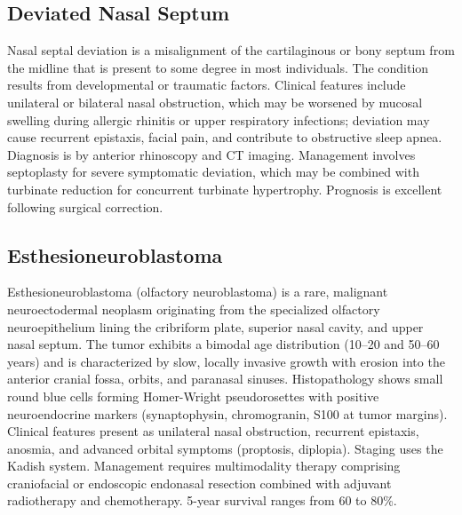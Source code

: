 \subsection{Deviated Nasal Septum}
\label{sec:Deviated Nasal Septum}
Nasal septal deviation is a misalignment of the cartilaginous or bony septum from the midline that is present to some degree in most individuals. The condition results from developmental or traumatic factors. Clinical features include unilateral or bilateral nasal obstruction, which may be worsened by mucosal swelling during allergic rhinitis or upper respiratory infections; deviation may cause recurrent epistaxis, facial pain, and contribute to obstructive sleep apnea. Diagnosis is by anterior rhinoscopy and CT imaging. Management involves septoplasty for severe symptomatic deviation, which may be combined with turbinate reduction for concurrent turbinate hypertrophy. Prognosis is excellent following surgical correction.

\subsection{Esthesioneuroblastoma}
\label{sec:Esthesioneuroblastoma}
Esthesioneuroblastoma (olfactory neuroblastoma) is a rare, malignant neuroectodermal neoplasm originating from the specialized olfactory neuroepithelium lining the cribriform plate, superior nasal cavity, and upper nasal septum. The tumor exhibits a bimodal age distribution (10--20 and 50--60 years) and is characterized by slow, locally invasive growth with erosion into the anterior cranial fossa, orbits, and paranasal sinuses. Histopathology shows small round blue cells forming Homer-Wright pseudorosettes with positive neuroendocrine markers (synaptophysin, chromogranin, S100 at tumor margins). Clinical features present as unilateral nasal obstruction, recurrent epistaxis, anosmia, and advanced orbital symptoms (proptosis, diplopia). Staging uses the Kadish system. Management requires multimodality therapy comprising craniofacial or endoscopic endonasal resection combined with adjuvant radiotherapy and chemotherapy. 5-year survival ranges from 60 to 80\%.

